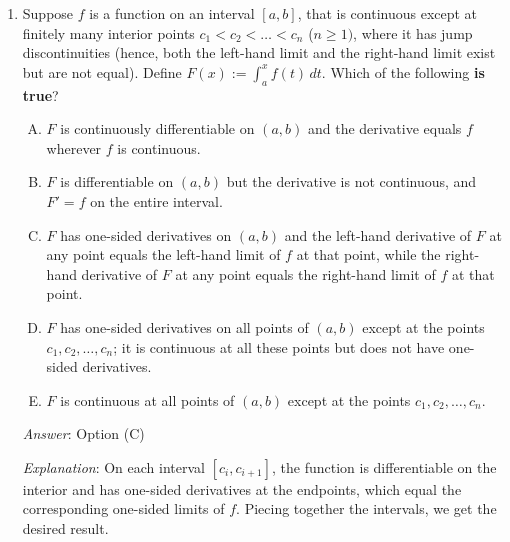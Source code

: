 \documentclass[10pt]{amsart}
\begin{document}
\begin{enumerate}
  {\em Answer}: Option (A)

  {\em Explanation}: Clearly, $(f + g)''' = f''' + g'''$, so if $f'''
  = g''' = 0$, then $(f + g)''' = 0$.

  Counterexamples for the others: for products, take $f(x) = g(x) =
  x^2$. For composites, the same counterexample works. What's
  different from the previous problem is that while a composite of
  linear polynomials is linear, a composite of quadratic polynomials
  has degree $4$.

  {\em Performance review}: $7$ out of $11$ got this correct. $2$
  chose (B) and $2$ chose (D).

  {\em Historical note (last year)}: $12$ out of $15$ people got this
  correct. $3$ people chose (D).

\item Suppose $f$ is a function on an interval $[a,b]$, that is
  continuous except at finitely many interior points $c_1 < c_2 <
  \dots < c_n$ ($n \ge 1)$, where it has jump discontinuities (hence,
  both the left-hand limit and the right-hand limit exist but are not
  equal). Define $F(x) := \int_a^x f(t) \, dt$. Which of the following
  {\bf is true}?

  \begin{enumerate}[(A)]
  \item $F$ is continuously differentiable on $(a,b)$ and the
    derivative equals $f$ wherever $f$ is continuous.
  \item $F$ is differentiable on $(a,b)$ but the derivative is not
    continuous, and $F' = f$ on the entire interval.
  \item $F$ has one-sided derivatives on $(a,b)$ and the left-hand
    derivative of $F$ at any point equals the left-hand limit of $f$
    at that point, while the right-hand derivative of $F$ at any point
    equals the right-hand limit of $f$ at that point.
  \item $F$ has one-sided derivatives on all points of $(a,b)$ except
    at the points $c_1, c_2, \dots, c_n$; it is continuous at all
    these points but does not have one-sided derivatives.
  \item $F$ is continuous at all points of $(a,b)$ except at the
  points $c_1, c_2, \dots, c_n$.
  \end{enumerate}

  {\em Answer}: Option (C)

  {\em Explanation}: On each interval $[c_i,c_{i+1}]$, the function is
  differentiable on the interior and has one-sided derivatives at the
  endpoints, which equal the corresponding one-sided limits of
  $f$. Piecing together the intervals, we get the desired result.


\end{enumerate}
\end{document}
